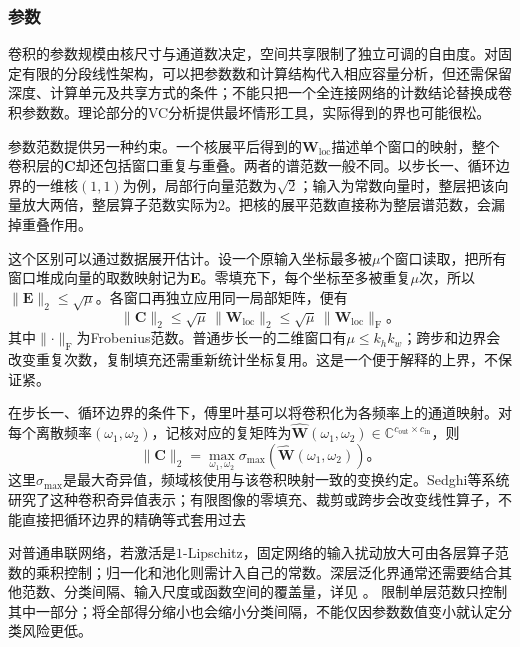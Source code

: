 \subsubsection{参数}
\label{sec:cnn-parameter-generalization}

卷积的参数规模由核尺寸与通道数决定，空间共享限制了独立可调的自由度。对固定有限的分段线性架构，可以把参数数和计算结构代入相应容量分析，但还需保留深度、计算单元及共享方式的条件；不能只把一个全连接网络的计数结论替换成卷积参数数。理论部分的VC分析提供最坏情形工具，实际得到的界也可能很松。

参数范数提供另一种约束。一个核展平后得到的$\bm W_{\mathrm{loc}}$描述单个窗口的映射，整个卷积层的$\bm C$却还包括窗口重复与重叠。两者的谱范数一般不同。以步长一、循环边界的一维核$(1,1)$为例，局部行向量范数为$\sqrt2$；输入为常数向量时，整层把该向量放大两倍，整层算子范数实际为$2$。把核的展平范数直接称为整层谱范数，会漏掉重叠作用。

这个区别可以通过数据展开估计。设一个原输入坐标最多被$\mu$个窗口读取，把所有窗口堆成向量的取数映射记为$\bm E$。零填充下，每个坐标至多被重复$\mu$次，所以$\lVert\bm E\rVert_2\leq\sqrt\mu$。各窗口再独立应用同一局部矩阵，便有
\begin{equation}
  \lVert\bm C\rVert_2
    \leq\sqrt\mu\,\lVert\bm W_{\mathrm{loc}}\rVert_2
    \leq\sqrt\mu\,\lVert\bm W_{\mathrm{loc}}\rVert_{\mathrm F}\text{。}
  \label{eq:cnn-operator-bound}
\end{equation}
其中$\lVert\cdot\rVert_{\mathrm F}$为Frobenius范数。普通步长一的二维窗口有$\mu\leq k_hk_w$；跨步和边界会改变重复次数，复制填充还需重新统计坐标复用。这是一个便于解释的上界，不保证紧。

在步长一、循环边界的条件下，傅里叶基可以将卷积化为各频率上的通道映射。对每个离散频率$(\omega_1,\omega_2)$，记核对应的复矩阵为$\widehat{\bm W}(\omega_1,\omega_2)\in\mathbb C^{c_{\mathrm{out}}\times c_{\mathrm{in}}}$，则
\begin{equation}
  \lVert\bm C\rVert_2
    =\max_{\omega_1,\omega_2}
       \sigma_{\max}\!\left(\widehat{\bm W}(\omega_1,\omega_2)\right)\text{。}
  \label{eq:cnn-fourier-norm}
\end{equation}
这里$\sigma_{\max}$是最大奇异值，频域核使用与该卷积映射一致的变换约定。Sedghi等系统研究了这种卷积奇异值表示；有限图像的零填充、裁剪或跨步会改变线性算子，不能直接把循环边界的精确等式套用过去

对普通串联网络，若激活是$1$-Lipschitz，固定网络的输入扰动放大可由各层算子范数的乘积控制；归一化和池化则需计入自己的常数。深层泛化界通常还需要结合其他范数、分类间隔、输入尺度或函数空间的覆盖量，详见
。
限制单层范数只控制其中一部分；将全部得分缩小也会缩小分类间隔，不能仅因参数数值变小就认定分类风险更低。

